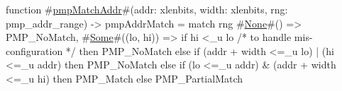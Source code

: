 function #\hyperref[sailRISCVzpmpMatchAddr]{pmpMatchAddr}#(addr: xlenbits, width: xlenbits, rng: pmp_addr_range) -> pmpAddrMatch = {
  match rng {
    #\hyperref[sailRISCVzNone]{None}#()         => PMP_NoMatch,
    #\hyperref[sailRISCVzSome]{Some}#((lo, hi)) => if   hi <_u lo   /* to handle mis-configuration */
                      then PMP_NoMatch
                      else {
                        if      (addr + width <=_u lo) | (hi <=_u addr)
                        then    PMP_NoMatch
                        else if (lo <=_u addr) & (addr + width <=_u hi)
                        then    PMP_Match
                        else    PMP_PartialMatch
                      }
  }
}
